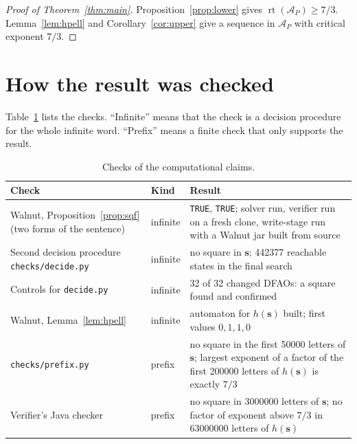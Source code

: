 \documentclass[11pt]{article}
\theoremstyle{definition}
\theoremstyle{remark}
\DeclareMathOperator{\rt}{rt}
\newcommand{\AP}{\mathcal{A}_P}
\newcommand{\PSQ}{\mathbf{s}}
\begin{document}
\begin{proof}[Proof of Theorem~\ref{thm:main}]
Proposition~\ref{prop:lower} gives $\rt(\AP) \ge 7/3$. Lemma~\ref{lem:hpell} and Corollary~\ref{cor:upper} give a sequence in $\AP$ with critical exponent $7/3$.
\end{proof}

\section{How the result was checked}\label{sec:checks}

Table~\ref{tab:checks} lists the checks. ``Infinite'' means that the check is a decision procedure for the whole infinite word. ``Prefix'' means a finite check that only supports the result.

\begin{table}[ht]
\centering
\small
\begin{tabular}{p{4.6cm}p{1.4cm}p{8.4cm}}
\toprule
Check & Kind & Result \\
\midrule
Walnut, Proposition~\ref{prop:sqf} (two forms of the sentence) & infinite & \texttt{TRUE}, \texttt{TRUE}; solver run, verifier run on a fresh clone, write-stage run with a Walnut jar built from source \\
Second decision procedure \texttt{checks/decide.py} & infinite & no square in $\PSQ$; 442377 reachable states in the final search \\
Controls for \texttt{decide.py} & infinite & 32 of 32 changed DFAOs: a square found and confirmed \\
Walnut, Lemma~\ref{lem:hpell} & infinite & automaton for $h(\PSQ)$ built; first values $0,1,1,0$ \\
\texttt{checks/prefix.py} & prefix & no square in the first 50000 letters of $\PSQ$; largest exponent of a factor of the first 200000 letters of $h(\PSQ)$ is exactly $7/3$ \\
Verifier's Java checker & prefix & no square in 3000000 letters of $\PSQ$; no factor of exponent above $7/3$ in 63000000 letters of $h(\PSQ)$ \\
\bottomrule
\end{tabular}
\caption{Checks of the computational claims.}
\label{tab:checks}
\end{table}
\end{document}
